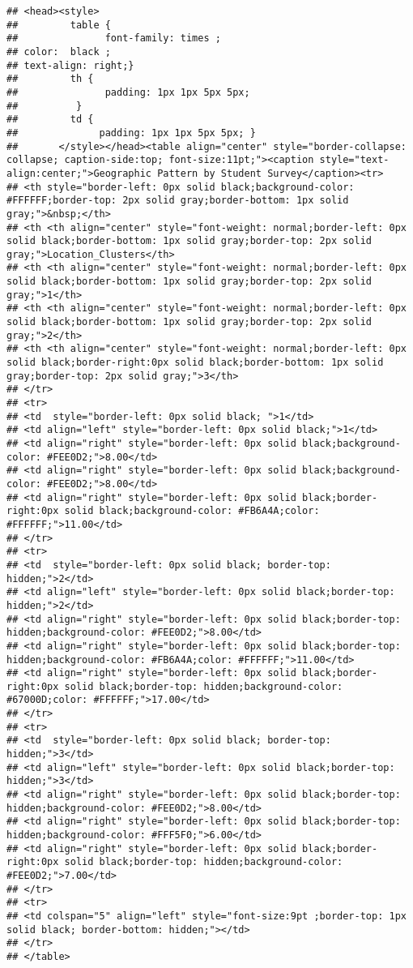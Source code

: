 \documentclass[
]{article}
\begin{document}
\begin{verbatim}
## <head><style>
##         table {
##               font-family: times ;
## color:  black ;
## text-align: right;}
##         th {
##               padding: 1px 1px 5px 5px;
##          }
##         td {
##              padding: 1px 1px 5px 5px; }
##       </style></head><table align="center" style="border-collapse: collapse; caption-side:top; font-size:11pt;"><caption style="text-align:center;">Geographic Pattern by Student Survey</caption><tr>
## <th style="border-left: 0px solid black;background-color: #FFFFFF;border-top: 2px solid gray;border-bottom: 1px solid gray;">&nbsp;</th>
## <th <th align="center" style="font-weight: normal;border-left: 0px solid black;border-bottom: 1px solid gray;border-top: 2px solid gray;">Location_Clusters</th>
## <th <th align="center" style="font-weight: normal;border-left: 0px solid black;border-bottom: 1px solid gray;border-top: 2px solid gray;">1</th>
## <th <th align="center" style="font-weight: normal;border-left: 0px solid black;border-bottom: 1px solid gray;border-top: 2px solid gray;">2</th>
## <th <th align="center" style="font-weight: normal;border-left: 0px solid black;border-right:0px solid black;border-bottom: 1px solid gray;border-top: 2px solid gray;">3</th>
## </tr>
## <tr>
## <td  style="border-left: 0px solid black; ">1</td>
## <td align="left" style="border-left: 0px solid black;">1</td>
## <td align="right" style="border-left: 0px solid black;background-color: #FEE0D2;">8.00</td>
## <td align="right" style="border-left: 0px solid black;background-color: #FEE0D2;">8.00</td>
## <td align="right" style="border-left: 0px solid black;border-right:0px solid black;background-color: #FB6A4A;color: #FFFFFF;">11.00</td>
## </tr>
## <tr>
## <td  style="border-left: 0px solid black; border-top: hidden;">2</td>
## <td align="left" style="border-left: 0px solid black;border-top: hidden;">2</td>
## <td align="right" style="border-left: 0px solid black;border-top: hidden;background-color: #FEE0D2;">8.00</td>
## <td align="right" style="border-left: 0px solid black;border-top: hidden;background-color: #FB6A4A;color: #FFFFFF;">11.00</td>
## <td align="right" style="border-left: 0px solid black;border-right:0px solid black;border-top: hidden;background-color: #67000D;color: #FFFFFF;">17.00</td>
## </tr>
## <tr>
## <td  style="border-left: 0px solid black; border-top: hidden;">3</td>
## <td align="left" style="border-left: 0px solid black;border-top: hidden;">3</td>
## <td align="right" style="border-left: 0px solid black;border-top: hidden;background-color: #FEE0D2;">8.00</td>
## <td align="right" style="border-left: 0px solid black;border-top: hidden;background-color: #FFF5F0;">6.00</td>
## <td align="right" style="border-left: 0px solid black;border-right:0px solid black;border-top: hidden;background-color: #FEE0D2;">7.00</td>
## </tr>
## <tr>
## <td colspan="5" align="left" style="font-size:9pt ;border-top: 1px solid black; border-bottom: hidden;"></td>
## </tr>
## </table>
\end{verbatim}
\end{document}
